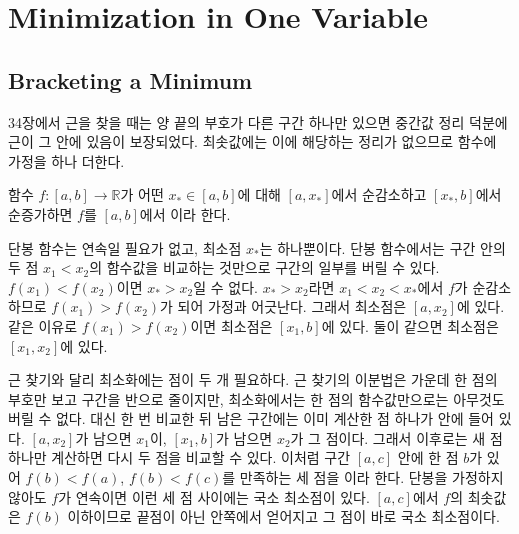 \chapter{Minimization in One Variable}
\label{ch:scalar-minimization}


\section{Bracketing a Minimum}
\label{sec:min-bracket}

34장에서 근을 찾을 때는 양 끝의 부호가 다른 구간 하나만 있으면 중간값 정리 덕분에 근이 그 안에 있음이 보장되었다. 최솟값에는 이에 해당하는 정리가 없으므로 함수에 가정을 하나 더한다.

\begin{definition}
함수 $f:[a,b]\to\mathbb R$가 어떤 $x_\ast\in[a,b]$에 대해 $[a,x_\ast]$에서 순감소하고 $[x_\ast,b]$에서 순증가하면 $f$를 $[a,b]$에서 이라 한다.
\end{definition}

단봉 함수는 연속일 필요가 없고, 최소점 $x_\ast$는 하나뿐이다. 단봉 함수에서는 구간 안의 두 점 $x_1<x_2$의 함수값을 비교하는 것만으로 구간의 일부를 버릴 수 있다. $f(x_1)<f(x_2)$이면 $x_\ast>x_2$일 수 없다. $x_\ast>x_2$라면 $x_1<x_2<x_\ast$에서 $f$가 순감소하므로 $f(x_1)>f(x_2)$가 되어 가정과 어긋난다. 그래서 최소점은 $[a,x_2]$에 있다. 같은 이유로 $f(x_1)>f(x_2)$이면 최소점은 $[x_1,b]$에 있다. 둘이 같으면 최소점은 $[x_1,x_2]$에 있다.

근 찾기와 달리 최소화에는 점이 두 개 필요하다. 근 찾기의 이분법은 가운데 한 점의 부호만 보고 구간을 반으로 줄이지만, 최소화에서는 한 점의 함수값만으로는 아무것도 버릴 수 없다. 대신 한 번 비교한 뒤 남은 구간에는 이미 계산한 점 하나가 안에 들어 있다. $[a,x_2]$가 남으면 $x_1$이, $[x_1,b]$가 남으면 $x_2$가 그 점이다. 그래서 이후로는 새 점 하나만 계산하면 다시 두 점을 비교할 수 있다. 이처럼 구간 $[a,c]$ 안에 한 점 $b$가 있어 $f(b)<f(a)$, $f(b)<f(c)$를 만족하는 세 점을 이라 한다. 단봉을 가정하지 않아도 $f$가 연속이면 이런 세 점 사이에는 국소 최소점이 있다. $[a,c]$에서 $f$의 최솟값은 $f(b)$ 이하이므로 끝점이 아닌 안쪽에서 얻어지고 그 점이 바로 국소 최소점이다.

